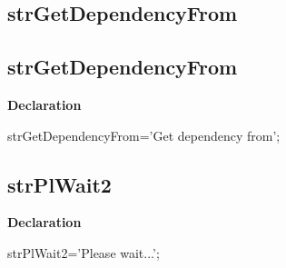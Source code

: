\documentclass{report}
\newif\ifpdf
\begin{document}
\subsection*{\large{\textbf{strGetDependencyFrom}}\normalsize\hspace{1ex}\hrulefill}
\else
\subsection*{strGetDependencyFrom}
\fi
\label{trstrings-strGetDependencyFrom}
\begin{list}{}{
\setlength{\itemindent}{0cm}
\setlength{\listparindent}{0cm}
\setlength{\leftmargin}{\evensidemargin}
\addtolength{\leftmargin}{\tmplength}
\settowidth{\labelsep}{X}
\addtolength{\leftmargin}{\labelsep}
\setlength{\labelwidth}{\tmplength}
}
\item[\textbf{Declaration}\hfill]
\ifpdf
\begin{flushleft}
\fi
\begin{ttfamily}
strGetDependencyFrom='Get dependency from';\end{ttfamily}

\ifpdf
\end{flushleft}
\fi

\end{list}
\ifpdf
\subsection*{\large{\textbf{strPlWait2}}\normalsize\hspace{1ex}\hrulefill}
\else
\subsection*{strPlWait2}
\fi
\label{trstrings-strPlWait2}
\begin{list}{}{
\setlength{\itemindent}{0cm}
\setlength{\listparindent}{0cm}
\setlength{\leftmargin}{\evensidemargin}
\addtolength{\leftmargin}{\tmplength}
\settowidth{\labelsep}{X}
\addtolength{\leftmargin}{\labelsep}
\setlength{\labelwidth}{\tmplength}
}
\item[\textbf{Declaration}\hfill]
\ifpdf
\begin{flushleft}
\fi
\begin{ttfamily}
strPlWait2='Please wait...';\end{ttfamily}

\ifpdf
\end{flushleft}
\fi

\end{list}
\ifpdf
\end{document}

